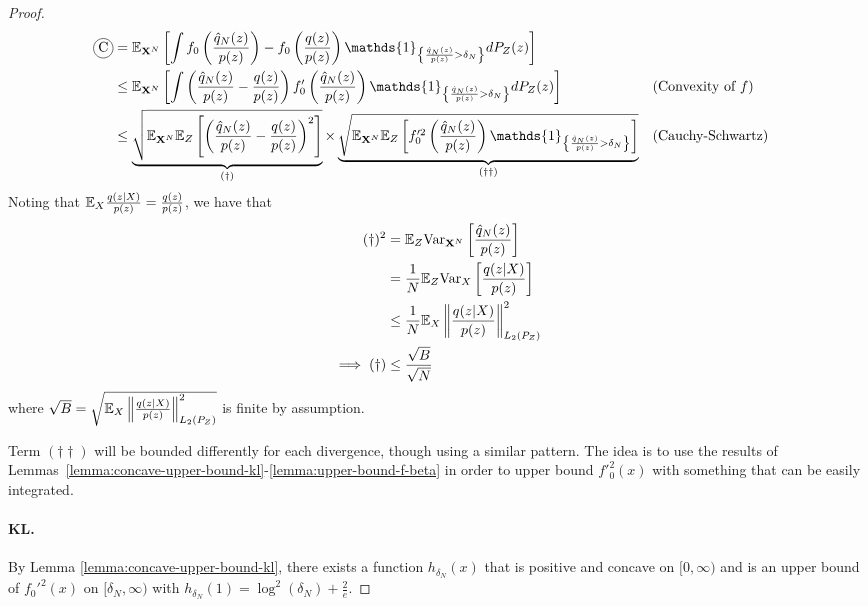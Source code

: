 \begin{proof}
\begin{align*}
    \encircle{C} &= \E_{\XN}\left[\int f_0\left( \frac{\hat{q}_N(z)}{p(z)}\right) - f_0\left( \frac{q(z)}{p(z)} \right) \mathds{1}_{\left\lbrace \frac{\hat{q}_N(z)}{p(z)} > \delta_N \right\rbrace} dP_Z(z)\right] \\
    &\leq \E_{\XN} \left[ \int \left(\frac{\hat{q}_N(z)}{p(z)} - \frac{q(z)}{p(z)}\right) f'_0\left(\frac{\hat{q}_N(z)}{p(z)} \right) \mathds{1}_{\left\lbrace \frac{\hat{q}_N(z)}{p(z)} > \delta_N \right\rbrace} dP_Z(z) \right]
    && \text{(Convexity of $f$)}
    \\
    &\leq \underbrace{\sqrt{\E_{\XN} \E_{Z}\left[ \left(\frac{\hat{q}_N(z)}{p(z)} - \frac{q(z)}{p(z)}\right)^2 \right]}}_{(\dagger)} \times 
    \underbrace{\sqrt{\E_{\XN} \E_{Z} \left[ f'^2_0\left(\frac{\hat{q}_N(z)}{p(z)} \right) \mathds{1}_{\left\lbrace \frac{\hat{q}_N(z)}{p(z)} > \delta_N \right\rbrace} \right]}}_{(\dagger\dagger)}
    && \text{(Cauchy-Schwartz)}
\end{align*}
Noting that $\mathbb{E}_{X} \frac{q(z|X)}{p(z)} = \frac{q(z)}{p(z)}$, we have that
\begin{align*}
    (\dagger)^2
    &= \mathbb{E}_Z \text{Var}_{\mathbf{X}^N} \left[ \frac{\hat{q}_N(z)}{p(z)}\right] \\
    &=  \frac{1}{N} \mathbb{E}_Z \text{Var}_{X} \left[ \frac{q(z|X)}{p(z)}\right] \\
    &\leq \frac{1}{N} \mathbb{E}_X \left\|\frac{q(z|X)}{p(z)} \right\|^2_{L_2(P_Z)}\\
    \implies (\dagger) &\leq \frac{\sqrt{B}}{\sqrt{N}}
\end{align*}
where $\sqrt{B} = \sqrt{\mathbb{E}_X \left\|\frac{q(z|X)}{p(z)} \right\|^2_{L_2(P_Z)}}$ is finite by assumption.

Term $(\dagger\dagger)$ will be bounded differently for each divergence, though using a similar pattern. 
The idea is to use the results of Lemmas~\ref{lemma:concave-upper-bound-kl}-\ref{lemma:upper-bound-f-beta} in order to upper bound $f'^2_0(x)$ with something that can be easily integrated.

\paragraph{KL.}

By Lemma \ref{lemma:concave-upper-bound-kl}, there exists a function $h_{\delta_N}(x)$ that is positive and concave on $[0, \infty)$ and is an upper bound of $f_0'^2(x)$ on $[\delta_N, \infty)$ with $h_{\delta_N}(1) = \log^2(\delta_N) + \frac{2}{e}$.


\end{proof}
